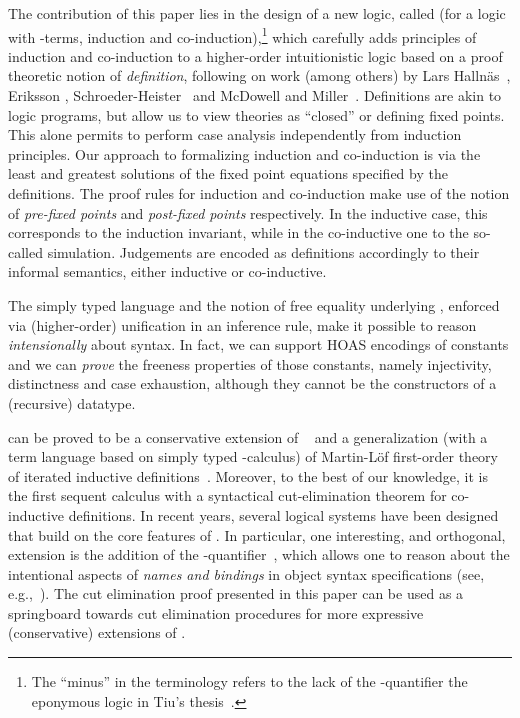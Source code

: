 \documentclass[preprint]{elsarticle}
\begin{document}
The contribution of this paper lies in the design of a new logic,
called  (for a logic with -terms, induction and
co-induction),\footnote{The ``minus'' in the terminology refers to the
  lack of the -quantifier \wrt the eponymous logic in Tiu's
  thesis~\cite{tiu04phd}.} which carefully adds principles of
induction and co-induction to a higher-order intuitionistic logic
based on a proof theoretic notion of \emph{definition}, following on
work (among others) by Lars Halln{\"{a}}s~\cite{PID}, Eriksson
\cite{eriksson91elp}, Schroeder-Heister~\cite{schroeder-heister93lics}
and McDowell and Miller~\cite{mcdowell00tcs}.  Definitions are akin to
logic programs, but allow us to view theories as ``closed'' or
defining fixed points.  This alone permits to perform case analysis
independently from induction principles.  Our approach to formalizing
induction and co-induction is via the least and greatest solutions of
the fixed point equations specified by the definitions. 
The proof rules for induction and co-induction make use of the notion
of \emph{pre-fixed points} and \emph{post-fixed points}
respectively. In the inductive case, this corresponds to the induction
invariant, while in the co-inductive one to the so-called simulation.
Judgements are encoded as definitions accordingly to their informal
semantics, either inductive or co-inductive.


The simply typed language and the notion of free equality underlying
, enforced via (higher-order) unification in an inference rule,
make it possible to reason \emph{intensionally} about syntax.
In fact, we can support HOAS encodings of constants
and we can \emph{prove} the freeness properties of those constants,
namely injectivity, distinctness and case exhaustion, although they
cannot be the constructors of a (recursive)
datatype.  




 can be proved to be a conservative extension of
~\cite{mcdowell00tcs} and a generalization (with a term
language based on simply typed -calculus) of Martin-L\"of
first-order theory of iterated inductive
definitions~\cite{martin-lof71sls}. Moreover, to the best of our
knowledge, it is the first sequent calculus with a syntactical
cut-elimination theorem for co-inductive definitions.  In recent
years, several logical systems have been designed that build on the
core features of . In particular, one interesting, and
orthogonal, extension is the addition of the
-quantifier~\cite{miller05tocl,tiu04phd,Tiu07,gacek08lics},
which allows one to reason about the intentional aspects of
\emph{names and bindings} in object syntax specifications (see,
e.g.,~\cite{AbellaSOS,TiuMillerpi}).  The cut elimination
proof presented in this paper can be used as a springboard towards cut
elimination procedures for more expressive (conservative) extensions
of . 
\end{document}
